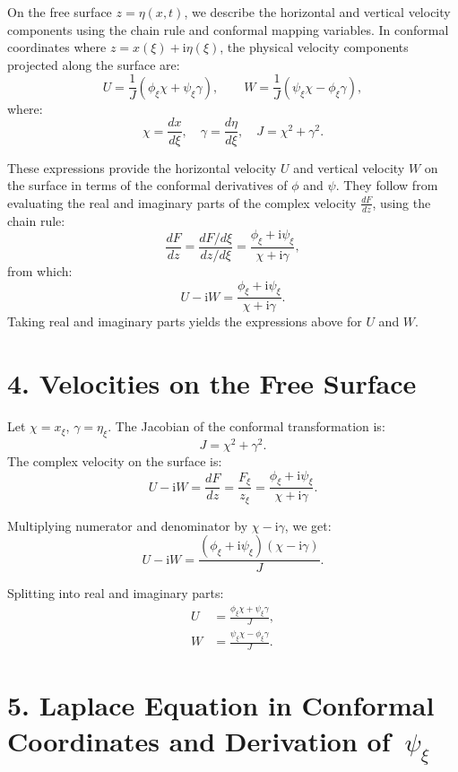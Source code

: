 \documentclass[12pt]{article}
\begin{document}
On the free surface \( z = \eta(x,t) \), we describe the horizontal and vertical velocity components using the chain rule and conformal mapping variables. In conformal coordinates where \( z = x(\xi) + \mathrm{i} \eta(\xi) \), the physical velocity components projected along the surface are:
\[
U = \frac{1}{J} \left( \phi_\xi \chi + \psi_\xi \gamma \right), \qquad
W = \frac{1}{J} \left( \psi_\xi \chi - \phi_\xi \gamma \right),
\]
where:
\[
\chi = \frac{d x}{d \xi}, \quad \gamma = \frac{d \eta}{d \xi}, \quad J = \chi^2 + \gamma^2.
\]

These expressions provide the horizontal velocity \( U \) and vertical velocity \( W \) on the surface in terms of the conformal derivatives of \( \phi \) and \( \psi \). They follow from evaluating the real and imaginary parts of the complex velocity \( \frac{dF}{dz} \), using the chain rule:
\[
\frac{dF}{dz} = \frac{dF/d\xi}{dz/d\xi} = \frac{\phi_\xi + \mathrm{i}\psi_\xi}{\chi + \mathrm{i}\gamma},
\]
from which:
\[
U - \mathrm{i}W = \frac{\phi_\xi + \mathrm{i}\psi_\xi}{\chi + \mathrm{i}\gamma}.
\]
Taking real and imaginary parts yields the expressions above for \( U \) and \( W \).

\section*{4. Velocities on the Free Surface}

Let \( \chi = x_\xi \), \( \gamma = \eta_\xi \). The Jacobian of the conformal transformation is:
\[
J = \chi^2 + \gamma^2.
\]
The complex velocity on the surface is:
\[
U - \mathrm{i}W = \frac{dF}{dz} = \frac{F_\xi}{z_\xi} = \frac{\phi_\xi + \mathrm{i}\psi_\xi}{\chi + \mathrm{i}\gamma}.
\]

Multiplying numerator and denominator by \( \chi - \mathrm{i}\gamma \), we get:
\[
U - \mathrm{i}W = \frac{(\phi_\xi + \mathrm{i}\psi_\xi)(\chi - \mathrm{i}\gamma)}{J}.
\]

Splitting into real and imaginary parts:
\begin{align*}
U &= \frac{\phi_\xi \chi + \psi_\xi \gamma}{J}, \\
W &= \frac{\psi_\xi \chi - \phi_\xi \gamma}{J}.
\end{align*}

\section*{5. Laplace Equation in Conformal Coordinates and Derivation of~$\psi_{\xi}$}
\end{document}
